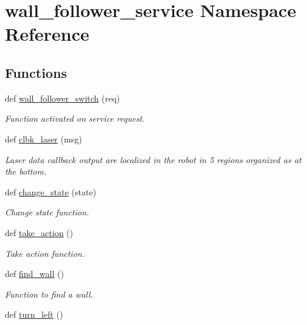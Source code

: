 \hypertarget{namespacewall__follower__service}{}\section{wall\+\_\+follower\+\_\+service Namespace Reference}
\label{namespacewall__follower__service}
\subsection*{Functions}
\begin{DoxyCompactItemize}
\item 
def \hyperlink{namespacewall__follower__service_a215aeb1ca629241f2f875ef081b21bb3}{wall\+\_\+follower\+\_\+switch} (req)
\begin{DoxyCompactList}\small\item\em Function activated on service request. \end{DoxyCompactList}\item 
def \hyperlink{namespacewall__follower__service_a09e3d81acac08943a5978c52bcbbfe26}{clbk\+\_\+laser} (msg)
\begin{DoxyCompactList}\small\item\em Laser data callback output are localized in the robot in 5 regions organized as at the bottom. \end{DoxyCompactList}\item 
def \hyperlink{namespacewall__follower__service_a170c8a7e77b51a43f5b3edd8b0062ac4}{change\+\_\+state} (state)
\begin{DoxyCompactList}\small\item\em Change state function. \end{DoxyCompactList}\item 
def \hyperlink{namespacewall__follower__service_a6627caa18de98475bf401975a5a4feb1}{take\+\_\+action} ()
\begin{DoxyCompactList}\small\item\em Take action function. \end{DoxyCompactList}\item 
def \hyperlink{namespacewall__follower__service_a84de27c394cf900d7c30a6ab16409304}{find\+\_\+wall} ()
\begin{DoxyCompactList}\small\item\em Function to find a wall. \end{DoxyCompactList}\item 
def \hyperlink{namespacewall__follower__service_a242dccb66f79027a138469906f3c10e1}{turn\+\_\+left} ()

\end{DoxyCompactItemize}
